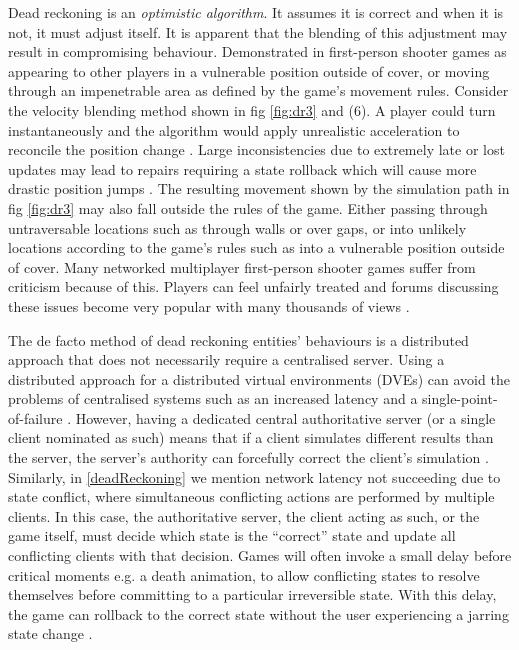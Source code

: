 \documentclass[journal]{IEEEtran}
\begin{document}
Dead reckoning is an \textit{optimistic algorithm}. It assumes it is correct  and when it is not, it must adjust itself. It is apparent that the blending of this adjustment may result in compromising behaviour. Demonstrated in first-person shooter games as appearing to other players in a vulnerable position outside of cover, or moving through an impenetrable area as defined by the game's movement rules. Consider the velocity blending method shown in fig \ref{fig:dr3} and (6). A player could turn instantaneously and the algorithm would apply unrealistic acceleration to reconcile the position change \cite{bernier2001latency}. Large inconsistencies due to extremely late or lost updates may lead to repairs requiring a state rollback which will cause more drastic position jumps \cite{cronin2002efficient}. The resulting movement shown by the simulation path in fig \ref{fig:dr3} may also fall outside the rules of the game. Either passing through untraversable locations such as through walls or over gaps, or into unlikely locations according to the game's rules such as into a vulnerable position outside of cover. Many networked multiplayer first-person shooter games suffer from criticism because of this. Players can feel unfairly treated and forums discussing these issues become very popular with many thousands of views \cite{rout2013youtube} \cite{gkac2014gamefaqs} \cite{drift0r2013youtube} \cite{solaire2016reddit} \cite{ss2018reddit} \cite{hp2015bungie}.

The de facto method of dead reckoning entities' behaviours is a distributed approach that does not necessarily require a centralised server. Using a distributed approach for a distributed virtual environments (DVEs) can avoid the problems of centralised systems such as an increased latency and a single-point-of-failure \cite{mauve2000keep}. However, having a dedicated central authoritative server (or a single client nominated as such) means that if a client simulates different results than the server, the server’s authority can forcefully correct the client’s simulation \cite{bernier2001latency}. Similarly, in \ref{deadReckoning} we mention network latency not succeeding due to state conflict, where simultaneous conflicting actions are performed by multiple clients. In this case, the authoritative server, the client acting as such, or the game itself, must decide which state is the ``correct'' state and update all conflicting clients with that decision. Games will often invoke a small delay before critical moments e.g. a death animation, to allow conflicting states to resolve themselves before committing to a particular irreversible state. With this delay, the game can rollback to the correct state without the user experiencing a jarring state change \cite{mauve2000keep}.
\end{document}
